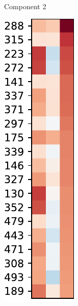 \begin{figure}[h]
\begin{subfigure}[b]{0.3\textwidth}
        \caption{Component 2}
    \end{subfigure}
    \hfill
    \begin{subfigure}[b]{0.3\textwidth}
        \centering
        \includegraphics[width=\textwidth]{figs/varimax-magnatagatune-2.pdf}

\end{subfigure}
\end{figure}
